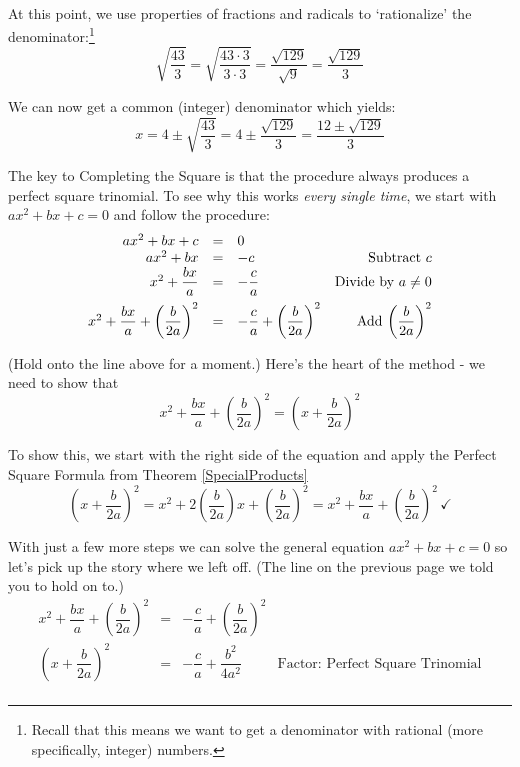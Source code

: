 \documentclass{ximera}
\begin{document}
{{{\[\begin{array}{rclr}
\end{array}\]

At this point, we use properties of fractions and radicals to `rationalize' the denominator:\footnote{Recall that this means we want to get a denominator with rational (more specifically, integer) numbers.}  \[ \sqrt{\dfrac{43}{3}} = \sqrt{\dfrac{43 \cdot 3}{3 \cdot 3}} = \dfrac{\sqrt{129}}{\sqrt{9}} = \dfrac{\sqrt{129}}{3} \]

We can now get a common (integer) denominator which yields: \[x=  4 \pm \sqrt{\dfrac{43}{3}} = 4 \pm \dfrac{\sqrt{129}}{3} = \dfrac{12 \pm \sqrt{129}}{3} \]

The key to Completing the Square is that the procedure always produces a perfect square trinomial. To see why this works \textit{every single time}, we start with $ax^2 + bx + c = 0$ and follow the procedure:\[ \begin{array}{rclr}

ax^2 + bx + c & = & 0 & \\

ax^2 + bx & = & -c & \text{Subtract $c$} \\

x^2 + \dfrac{bx}{a} & = & -\dfrac{c}{a} & \text{Divide by $a \neq 0$} \\ [8pt]

x^2 + \dfrac{bx}{a} + \left(\dfrac{b}{2a}\right)^2 & = & -\dfrac{c}{a} + \left(\dfrac{b}{2a}\right)^2 & \text{Add $ \left(\dfrac{b}{2a}\right)^2$} \\

\end{array} \]

(Hold onto the line above for a moment.)  Here's the heart of the method - we need to show that \[ x^2 + \dfrac{bx}{a} + \left(\dfrac{b}{2a}\right)^2 = \left(x + \dfrac{b}{2a}\right)^2 \]

To show this, we start with the right side of the equation and apply the Perfect Square Formula from Theorem \ref{SpecialProducts} \[ \left(x + \dfrac{b}{2a}\right)^2 = x^2 + 2\left(\dfrac{b}{2a}\right)x + \left(\dfrac{b}{2a}\right)^2 = x^2 + \dfrac{bx}{a} + \left(\dfrac{b}{2a}\right)^2 \, \checkmark \]

With just a few more steps we can solve the general equation $ax^{2} + bx + c = 0$ so let's pick up the story where we left off. (The line on the previous page we told you to hold on to.)\[ \begin{array}{rclr}

x^2 + \dfrac{bx}{a} + \left(\dfrac{b}{2a}\right)^2 & = & -\dfrac{c}{a} + \left(\dfrac{b}{2a}\right)^2 & \\ [8pt]
\left(x + \dfrac{b}{2a}\right)^2 & = & -\dfrac{c}{a} + \dfrac{b^2}{4a^2} & \text{Factor: Perfect Square Trinomial} \\ [3pt]


\end{array}\]}}}
\end{document}
